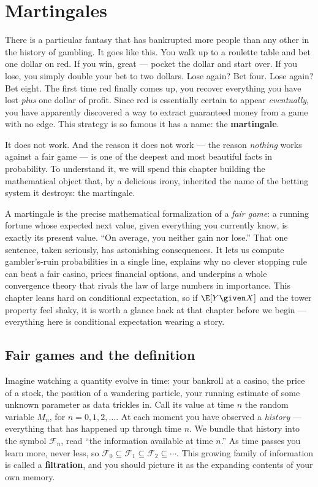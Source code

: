 \chapter{Martingales}

There is a particular fantasy that has bankrupted more people than any other in the history of
gambling. It goes like this. You walk up to a roulette table and bet one dollar on red. If you win,
great --- pocket the dollar and start over. If you lose, you simply double your bet to two dollars.
Lose again? Bet four. Lose again? Bet eight. The first time red finally comes up, you recover
everything you have lost \emph{plus} one dollar of profit. Since red is essentially certain to appear
\emph{eventually}, you have apparently discovered a way to extract guaranteed money from a game with
no edge. This strategy is so famous it has a name: the \textbf{martingale}.

It does not work. And the reason it does not work --- the reason \emph{nothing} works against a fair
game --- is one of the deepest and most beautiful facts in probability. To understand it, we will
spend this chapter building the mathematical object that, by a delicious irony, inherited the name of
the betting system it destroys: the martingale.

A martingale is the precise mathematical formalization of a \emph{fair game}: a running fortune whose
expected next value, given everything you currently know, is exactly its present value. ``On average,
you neither gain nor lose.'' That one sentence, taken seriously, has astonishing consequences. It lets
us compute gambler's-ruin probabilities in a single line, explains why no clever stopping rule can
beat a fair casino, prices financial options, and underpins a whole convergence theory that rivals the
law of large numbers in importance. This chapter leans hard on conditional expectation, so if
$\E[Y \given X]$ and the tower property feel shaky, it is worth a glance back at that chapter before we
begin --- everything here is conditional expectation wearing a story.

\section{Fair games and the definition}
\label{ch28:definition}

Imagine watching a quantity evolve in time: your bankroll at a casino, the price of a stock, the
position of a wandering particle, your running estimate of some unknown parameter as data trickles in.
Call its value at time $n$ the random variable $M_n$, for $n = 0, 1, 2, \dots$. At each moment you
have observed a \emph{history} --- everything that has happened up through time $n$. We bundle that
history into the symbol $\mathcal{F}_n$, read ``the information available at time $n$.'' As time
passes you learn more, never less, so $\mathcal{F}_0 \subseteq \mathcal{F}_1 \subseteq \mathcal{F}_2
\subseteq \cdots$. This growing family of information is called a \textbf{filtration}, and you should
picture it as the expanding contents of your own memory.


